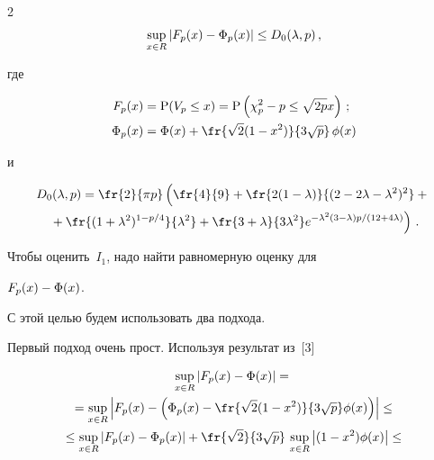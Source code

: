 \begin{multicols}{2}
\begin{equation*}

\sup\limits_{x \in R} |F_p(x) - \IP_p(x)| \leq D_0(\lambda,p)\,,

\end{equation*}

где

\begin{align*}

F_p(x) &= \P(V_p \le x) =\P\left(\chi^{2}_p -p \le \sqrt{2p}x\right)\,; \\

\IP_p(x) &= \IP(x) + \fr{\sqrt{2}(1-x^2)}{3\sqrt{p}}\,\Ip(x)

\end{align*}

и    

\begin{multline*}

D_0(\lambda,p)= \fr{2}{\pi p}\left(

\vphantom{\fr{(1+\lambda^2)^{1-p/4}}{\lambda^2}}

\fr{4}{9}+\fr{2(1-\lambda)}{(2-2\lambda-\lambda^2)^2}+{}\right.\\

\left.{}+

\fr{(1+\lambda^2)^{1-p/4}}{\lambda^2}+

\fr{3+\lambda}{3\lambda^2}

e^{-\lambda^2(3-\lambda)p/(12+4\lambda)} \right)\,.

\end{multline*}

 Чтобы оценить~$I_1$,  надо найти равномерную оценку для  

$F_p(x) - \mbox{$\Phi$}(x)$.

С этой целью будем использовать два подхода.

Первый подход очень прост. Используя  результат из~[3]

\begin{multline*}

\sup\limits_{x \in R} |F_p(x) - \IP(x)|={}\\

{}  = \sup\limits_{x \in R} \left|F_p(x) - \left(\IP_p(x) -

  \fr{\sqrt{2}(1-x^2)}{3\sqrt{p}}\Ip(x)\right)\right|\leq{}\\

{}  \leq \sup\limits_{x \in R} \left|F_p(x) -\IP_p(x) \right|+

  \fr{\sqrt{2}}{3\sqrt{p}}\,\sup\limits_{x \in R}\left|(1-x^2)\Ip(x)\right|\leq{}\\


\end{multline*}
\end{multicols}
